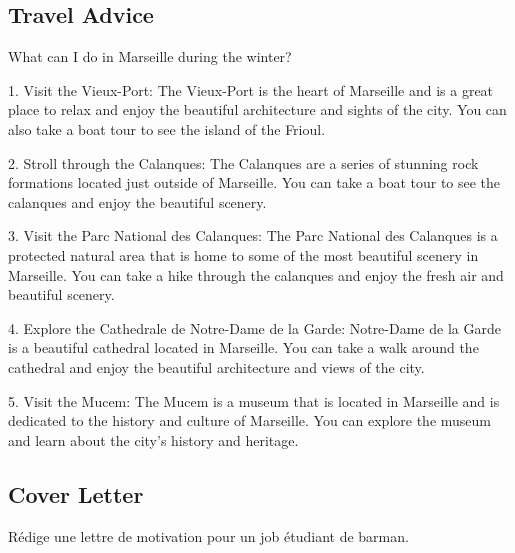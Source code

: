 \subsection{Travel Advice}

\begin{promptkaobox}[frametitle=Prompt]
What can I do in Marseille during the winter?
\end{promptkaobox}

\begin{completionkaobox}[frametitle=CroissantLLMChat]
1. Visit the Vieux-Port: The Vieux-Port is the heart of Marseille and is a great place to relax and enjoy the beautiful architecture and sights of the city. You can also take a boat tour to see the island of the Frioul.

2. Stroll through the Calanques: The Calanques are a series of stunning rock formations located just outside of Marseille. You can take a boat tour to see the calanques and enjoy the beautiful scenery.

3. Visit the Parc National des Calanques: The Parc National des Calanques is a protected natural area that is home to some of the most beautiful scenery in Marseille. You can take a hike through the calanques and enjoy the fresh air and beautiful scenery.

4. Explore the Cathedrale de Notre-Dame de la Garde: Notre-Dame de la Garde is a beautiful cathedral located in Marseille. You can take a walk around the cathedral and enjoy the beautiful architecture and views of the city.

5. Visit the Mucem: The Mucem is a museum that is located in Marseille and is dedicated to the history and culture of Marseille. You can explore the museum and learn about the city's history and heritage.
\end{completionkaobox}

\subsection{Cover Letter}

\begin{promptkaobox}[frametitle=Prompt]
Rédige une lettre de motivation pour un job étudiant de barman.
\end{promptkaobox}

